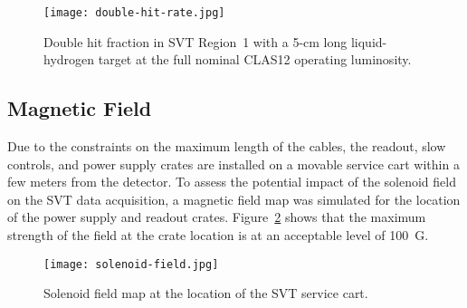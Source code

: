 \begin{figure}[hbt] 
\centering 
\texttt{[image: double-hit-rate.jpg]}
\caption{Double hit fraction in SVT Region~1 with a 5-cm long liquid-hydrogen target at the full nominal
  CLAS12 operating luminosity.}
\label{fig:double-hit-rate}
\end{figure}

\subsection{Magnetic Field}

Due to the constraints on the maximum length of the cables, the readout, slow controls, and power supply crates
are installed on a movable service cart within a few meters from the detector. To assess the potential impact of
the solenoid field on the SVT data acquisition, a magnetic field map was simulated for the location of the power
supply and readout crates. Figure~\ref{fig:solenoid-field} shows that the maximum strength of the field at the
crate location is at an acceptable level of 100~G.

\begin{figure}[hbt] 
\centering 
\texttt{[image: solenoid-field.jpg]}
\caption{Solenoid field map at the location of the SVT service cart.}
\label{fig:solenoid-field}
\end{figure}



